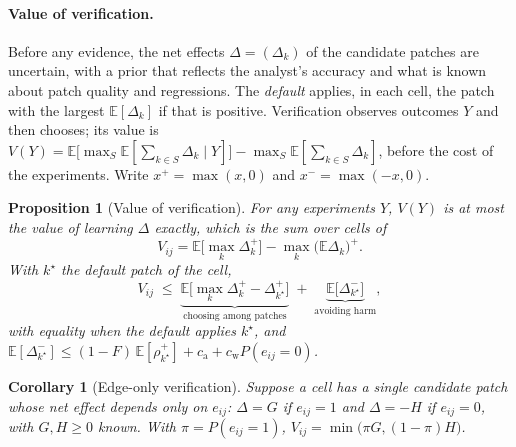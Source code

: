 \documentclass[11pt]{article}
\newtheorem{proposition}{Proposition}
\newtheorem{corollary}{Corollary}
\begin{document}
\paragraph{Value of verification.} Before any evidence, the net effects $\Delta=(\Delta_k)$ of the candidate patches are uncertain, with a prior that reflects the analyst's accuracy and what is known about patch quality and regressions. The \emph{default} applies, in each cell, the patch with the largest $\mathbb E[\Delta_k]$ if that is positive. Verification observes outcomes $Y$ and then chooses; its value is $V(Y)=\mathbb E\big[\max_S\mathbb E[\sum_{k\in S}\Delta_k\mid Y]\big]-\max_S\mathbb E[\sum_{k\in S}\Delta_k]$, before the cost of the experiments. Write $x^+=\max(x,0)$ and $x^-=\max(-x,0)$.

\begin{proposition}[Value of verification]
\label{prop:vpi}
For any experiments $Y$, $V(Y)$ is at most the value of learning $\Delta$ exactly, which is the sum over cells of
\begin{equation}
V_{ij}=\mathbb E\big[\max_k\Delta_k^+\big]-\max_k\big(\mathbb E\Delta_k\big)^+ .
\end{equation}
With $k^\star$ the default patch of the cell,
\begin{equation}
V_{ij}\;\le\;\underbrace{\mathbb E\big[\max_k\Delta_k^+-\Delta_{k^\star}^+\big]}_{\text{choosing among patches}}\;+\;\underbrace{\mathbb E\big[\Delta_{k^\star}^-\big]}_{\text{avoiding harm}},
\label{eq:vpi}
\end{equation}
with equality when the default applies $k^\star$, and $\mathbb E[\Delta_{k^\star}^-]\le(1-F)\,\mathbb E[\rho_{k^\star}^+]+c_{\mathrm a}+c_{\mathrm w}P(e_{ij}{=}0)$.
\end{proposition}

\begin{corollary}[Edge-only verification]
\label{cor:edge}
Suppose a cell has a single candidate patch whose net effect depends only on $e_{ij}$: $\Delta=G$ if $e_{ij}=1$ and $\Delta=-H$ if $e_{ij}=0$, with $G,H\ge0$ known. With $\pi=P(e_{ij}{=}1)$, $V_{ij}=\min\big(\pi G,(1-\pi)H\big)$.
\end{corollary}
\end{document}
